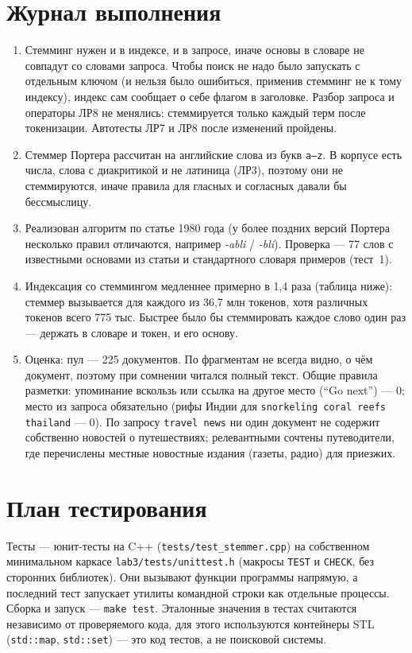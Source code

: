 \section{Журнал выполнения}
\begin{enumerate}
    \item Стемминг нужен и в индексе, и в запросе, иначе основы в словаре не совпадут со словами запроса. Чтобы поиск не надо было запускать с отдельным ключом (и нельзя было ошибиться, применив стемминг не к тому индексу), индекс сам сообщает о себе флагом в заголовке. Разбор запроса и операторы ЛР8 не менялись: стеммируется только каждый терм после токенизации. Автотесты ЛР7 и ЛР8 после изменений пройдены.
    \item Стеммер Портера рассчитан на английские слова из букв \texttt{a--z}. В корпусе есть числа, слова с диакритикой и не латиница (ЛР3), поэтому они не стеммируются, иначе правила для гласных и согласных давали бы бессмыслицу.
    \item Реализован алгоритм по статье 1980 года (у более поздних версий Портера несколько правил отличаются, например \emph{-abli} / \emph{-bli}). Проверка --- 77 слов с известными основами из статьи и стандартного словаря примеров (тест~1).
    \item Индексация со стеммингом медленнее примерно в 1,4 раза (таблица ниже): стеммер вызывается для каждого из 36,7 млн токенов, хотя различных токенов всего 775 тыс. Быстрее было бы стеммировать каждое слово один раз --- держать в словаре и токен, и его основу.
    \item Оценка: пул --- 225 документов. По фрагментам не всегда видно, о чём документ, поэтому при сомнении читался полный текст. Общие правила разметки: упоминание вскользь или ссылка на другое место (\enquote{Go next}) --- 0; место из запроса обязательно (рифы Индии для \texttt{snorkeling coral reefs thailand} --- 0). По запросу \texttt{travel news} ни один документ не содержит собственно новостей о путешествиях; релевантными сочтены путеводители, где перечислены местные новостные издания (газеты, радио) для приезжих.
\end{enumerate}

\section{План тестирования}
Тесты --- юнит-тесты на C++ (\texttt{tests/test\_stemmer.cpp}) на собственном минимальном каркасе \texttt{lab3/tests/unittest.h} (макросы \texttt{TEST} и \texttt{CHECK}, без сторонних библиотек). Они вызывают функции программы напрямую, а последний тест запускает утилиты командной строки как отдельные процессы. Сборка и запуск --- \texttt{make test}. Эталонные значения в тестах считаются независимо от проверяемого кода, для этого используются контейнеры STL (\texttt{std::map}, \texttt{std::set}) --- это код тестов, а не поисковой системы.

